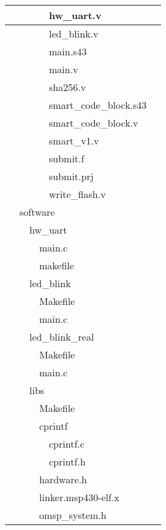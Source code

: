\begin{longtable}{|p{0.15cm}|p{0.15cm}|p{0.15cm}|p{0.15cm}|p{0.15cm}|p{0.15cm}|p{8.6cm}|}
	\hline
	& & & & \multicolumn{2}{l|}{hw\_uart.v} & \\
	\hline
	& & & & \multicolumn{2}{l|}{led\_blink.v} & \\
	\hline
	& & & & \multicolumn{2}{l|}{main.s43} & \\
	\hline
	& & & & \multicolumn{2}{l|}{main.v} & \\
	\hline
	& & & & \multicolumn{2}{l|}{sha256.v} & \\
	\hline
	& & & & \multicolumn{2}{l|}{smart\_code\_block.s43} & \\
	\hline
	& & & & \multicolumn{2}{l|}{smart\_code\_block.v} & \\
	\hline
	& & & & \multicolumn{2}{l|}{smart\_v1.v} & \\
	\hline
	& & & & \multicolumn{2}{l|}{submit.f} & \\
	\hline
	& & & & \multicolumn{2}{l|}{submit.prj} & \\
	\hline
	& & & & \multicolumn{2}{l|}{write\_flash.v} & \\
	\hline
	& \multicolumn{5}{l|}{software} & \\
	\hline
	& & \multicolumn{4}{l|}{hw\_uart} & \\
	\hline
	& & & \multicolumn{3}{l|}{main.c} & \\
	\hline
	& & & \multicolumn{3}{l|}{makefile} & \\
	\hline
	& & \multicolumn{4}{l|}{led\_blink} & \\
	\hline
	& & & \multicolumn{3}{l|}{Makefile} & \\
	\hline
	& & & \multicolumn{3}{l|}{main.c} & \\
	\hline
	& & \multicolumn{4}{l|}{led\_blink\_real} & \\
	\hline
	& & & \multicolumn{3}{l|}{Makefile} & \\
	\hline
	& & & \multicolumn{3}{l|}{main.c} & \\
	\hline
	& & \multicolumn{4}{l|}{libs} & \\
	\hline
	& & & \multicolumn{3}{l|}{Makefile} & \\
	\hline
	& & & \multicolumn{3}{l|}{cprintf} & \\
	\hline
	& & & & \multicolumn{2}{l|}{cprintf.c} & \\
	\hline
	& & & & \multicolumn{2}{l|}{cprintf.h} & \\
	\hline
	& & & \multicolumn{3}{l|}{hardware.h} & \\
	\hline
	& & & \multicolumn{3}{l|}{linker.msp430-elf.x} & \\
	\hline
	& & & \multicolumn{3}{l|}{omsp\_system.h} & \\

\end{longtable}
